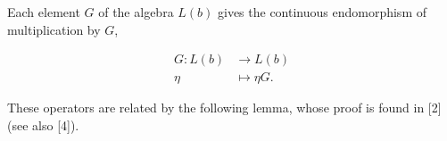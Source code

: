 Each element $G$ of the algebra $L(b)$ gives the continuous endomorphism
of multiplication by $G$,

\begin{equation}\tag{4.5.7}
\begin{aligned}
G:L(b)&\longrightarrow L(b)\\
\eta&\longmapsto\eta G.
\end{aligned}
\end{equation}

These operators are related by the following lemma, whose proof is found in
[2] (see also [4]).
